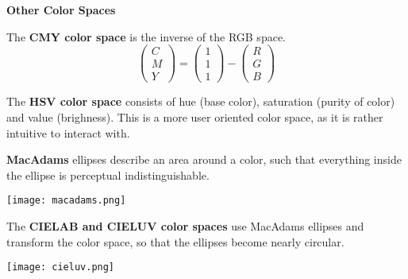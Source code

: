 \textbf{Other Color Spaces}\smallskip

The \textbf{CMY color space} is the inverse of the RGB space.
$$\begin{pmatrix}
	C \\ M \\ Y
\end{pmatrix} = \begin{pmatrix}
	1 \\ 1 \\ 1
\end{pmatrix} - \begin{pmatrix}
	R \\ G \\ B
\end{pmatrix}$$

The \textbf{HSV color space} consists of hue (base color), saturation (purity of color) and value (brighness). This is a more user oriented color space, as it is rather intuitive to interact with. \medskip

\textbf{MacAdams} ellipses describe an area around a color, such that everything inside the ellipse is perceptual indistinguishable.
\begin{center}
	\texttt{[image: macadams.png]}
\end{center}

The \textbf{CIELAB and CIELUV color spaces} use MacAdams ellipses and transform the color space, so that the ellipses become nearly circular.
\begin{center}
	\texttt{[image: cieluv.png]}
\end{center}

